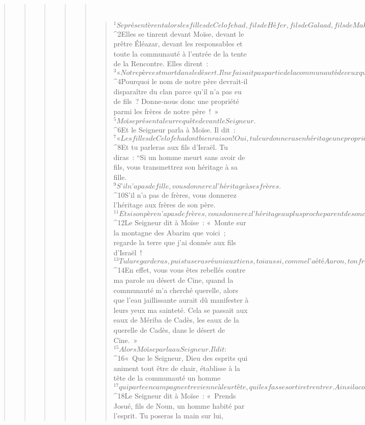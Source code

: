 \begin{verse}
\begin{verse}
\begin{verse}
\begin{verse}
\begin{verse}
         
      \bchapter{}
      \begin{verse}
${}^{1}Se présentèrent alors les filles de Celofehad, fils de Héfer, fils de Galaad, fils de Makir, fils de Manassé. Elles appartenaient à l’un des clans de Manassé, fils de Joseph. Voici les noms des filles de Celofehad : Mahla, Noa, Hogla, Milka et Tirça. 
${}^{2}Elles se tinrent devant Moïse, devant le prêtre Éléazar, devant les responsables et toute la communauté à l’entrée de la tente de la Rencontre. Elles dirent : 
${}^{3}« Notre père est mort dans le désert. Il ne faisait pas partie de la communauté de ceux qui se liguèrent contre le Seigneur, la communauté de Coré ; il est mort à cause de sa propre faute mais il n’avait pas de fils. 
${}^{4}Pourquoi le nom de notre père devrait-il disparaître du clan parce qu’il n’a pas eu de fils ? Donne-nous donc une propriété parmi les frères de notre père ! »
${}^{5}Moïse présenta leur requête devant le Seigneur. 
${}^{6}Et le Seigneur parla à Moïse. Il dit : 
${}^{7}« Les filles de Celofehad ont bien raison ! Oui, tu leur donneras en héritage une propriété parmi les frères de leur père. Tu leur transmettras l’héritage de leur père. 
${}^{8}Et tu parleras aux fils d’Israël. Tu diras : “Si un homme meurt sans avoir de fils, vous transmettrez son héritage à sa fille. 
${}^{9}S’il n’a pas de fille, vous donnerez l’héritage à ses frères. 
${}^{10}S’il n’a pas de frères, vous donnerez l’héritage aux frères de son père. 
${}^{11}Et si son père n’a pas de frères, vous donnerez l’héritage au plus proche parent de son clan, il en prendra possession.” C’est pour les fils d’Israël une règle de droit, comme le Seigneur l’a ordonné à Moïse. »
${}^{12}Le Seigneur dit à Moïse : « Monte sur la montagne des Abarim que voici ; regarde la terre que j’ai donnée aux fils d’Israël ! 
${}^{13}Tu la regarderas, puis tu seras réuni aux tiens, toi aussi, comme l’a été Aaron, ton frère. 
${}^{14}En effet, vous vous êtes rebellés contre ma parole au désert de Cine, quand la communauté m’a cherché querelle, alors que l’eau jaillissante aurait dû manifester à leurs yeux ma sainteté. Cela se passait aux eaux de Mériba de Cadès, les eaux de la querelle de Cadès, dans le désert de Cine. »
${}^{15}Alors Moïse parla au Seigneur. Il dit : 
${}^{16}« Que le Seigneur, Dieu des esprits qui animent tout être de chair, établisse à la tête de la communauté un homme 
${}^{17}qui parte en campagne et revienne à leur tête, qui les fasse sortir et rentrer. Ainsi la communauté du Seigneur ne sera pas comme du petit bétail sans berger. » 
${}^{18}Le Seigneur dit à Moïse : « Prends Josué, fils de Noun, un homme habité par l’esprit. Tu poseras la main sur lui, 

\end{verse}
\end{verse}
\end{verse}
\end{verse}
\end{verse}
\end{verse}
